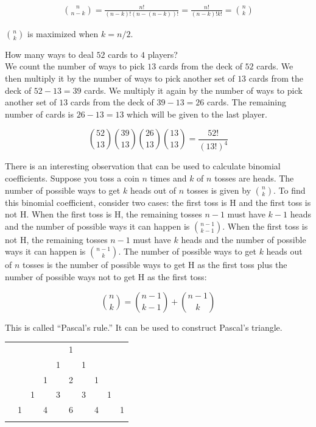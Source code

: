 \documentclass[12pt, a4paper]{article}
\newcounter{exa}
\begin{document}
\begin{align*}
\binom{n}{n-k} = \frac{n!}{(n-k)!(n-(n-k))!} = \frac{n!}{(n-k)!k!} = \binom{n}{k}
\end{align*}

$\binom{n}{k}$ is maximized when $k=n/2$.

\begin{texample}
How many ways to deal $52$ cards to $4$ players? \\

We count the number of ways to pick $13$ cards from the deck of $52$ cards. We then multiply it by the number of ways to pick another set of $13$ cards from the deck of $52-13=39$ cards. We multiply it again by the number of ways to pick another set of $13$ cards from the deck of $39-13=26$ cards. The remaining number of cards is $26-13=13$ which will be given to the last player.

$$\binom{52}{13}\binom{39}{13}\binom{26}{13}\binom{13}{13}=\frac{52!}{(13!)^4}$$
\end{texample}

There is an interesting observation that can be used to calculate binomial coefficients. Suppose you toss a coin $n$ times and $k$ of $n$ tosses are heads. The number of possible ways to get $k$ heads out of $n$ tosses is given by $\binom{n}{k}$. To find this binomial coefficient, consider two cases: the first toss is H and the first toss is not H. When the first toss is H, the remaining tosses $n-1$ must have $k-1$ heads and the number of possible ways it can happen is $\binom{n-1}{k-1}$. When the first toss is not H,  the remaining tosses $n-1$ must have $k$ heads and the number of possible ways it can happen is $\binom{n-1}{k}$. The number of possible ways to get $k$ heads out of $n$ tosses is the number of possible ways to get H as the first toss plus the number of possible ways not to get H as the first toss:

$$\binom{n}{k} = \binom{n-1}{k-1} + \binom{n-1}{k}$$

This is called ``Pascal's rule.'' It can be used to construct Pascal's triangle.

\begin{center}
\begin{tabular}{rccccccccc}
&    &    &    &    &  1\\\noalign{\smallskip\smallskip}
&    &    &    &  1 &    &  1\\\noalign{\smallskip\smallskip}
&    &    &  1 &    &  2 &    &  1\\\noalign{\smallskip\smallskip}
&    &  1 &    &  3 &    &  3 &    &  1\\\noalign{\smallskip\smallskip}
&  1 &    &  4 &    &  6 &    &  4 &    &  1\\\noalign{\smallskip\smallskip}
\end{tabular}
\end{center}
\end{document}
